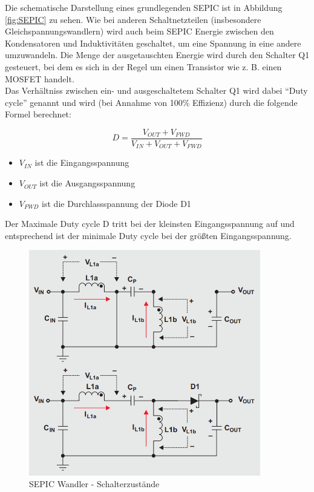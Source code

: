 Die schematische Darstellung eines grundlegenden SEPIC ist in Abbildung \ref{fig:SEPIC} zu sehen. Wie bei anderen
Schaltnetzteilen (insbesondere Gleichspannungswandlern) wird auch beim SEPIC Energie zwischen den Kondensatoren
und Induktivitäten geschaltet, um eine Spannung in eine andere umzuwandeln. Die Menge der ausgetauschten Energie
wird durch den Schalter Q1 gesteuert, bei dem es sich in der Regel um einen Transistor wie z. B. einen \ac{MOSFET}
handelt. \\
Das Verhältniss zwischen ein- und ausgeschaltetem Schalter Q1 wird dabei \enquote{Duty cycle} genannt und wird
(bei Annahme von 100\% Effizienz) durch die folgende Formel berechnet:

\[\displaystyle D = \frac{V_{OUT} + V_{FWD}}{V_{IN} + V_{OUT} + V_{FWD}}\]

\begin{itemize}
    \item \(V_{IN}\)  ist die Eingangsspannung
    \item \(V_{OUT}\) ist die Ausgangsspannung
    \item \(V_{FWD}\) ist die Durchlassspannung der Diode D1
\end{itemize}

Der Maximale Duty cycle D tritt bei der kleinsten Eingangsspannung auf und entsprechend ist der minimale
Duty cycle bei der größten Eingangsspannung.

\begin{figure}[H]
    \centering
    \includegraphics[width=0.9\textwidth]{resources/images/sepic_schalter.png}
    \caption[SEPIC Spannungen]{SEPIC Wandler - Schalterzustände}
    \label{fig:SEPIC_Schalter}
\end{figure}

